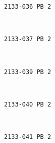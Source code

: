 \documentclass[11pt]{article}
\begin{document}
    \begin{Verbatim}[commandchars=\\\{\}]
2133-036 PB 2

    \end{Verbatim}

    \begin{center}
    \end{center}
    { \hspace*{\fill} \\}
    
    \begin{Verbatim}[commandchars=\\\{\}]
2133-037 PB 2

    \end{Verbatim}

    \begin{center}
    \end{center}
    { \hspace*{\fill} \\}
    
    \begin{Verbatim}[commandchars=\\\{\}]
2133-039 PB 2

    \end{Verbatim}

    \begin{center}
    \end{center}
    { \hspace*{\fill} \\}
    
    \begin{Verbatim}[commandchars=\\\{\}]
2133-040 PB 2

    \end{Verbatim}

    \begin{center}
    \end{center}
    { \hspace*{\fill} \\}
    
    \begin{Verbatim}[commandchars=\\\{\}]
2133-041 PB 2

    \end{Verbatim}
\end{document}
